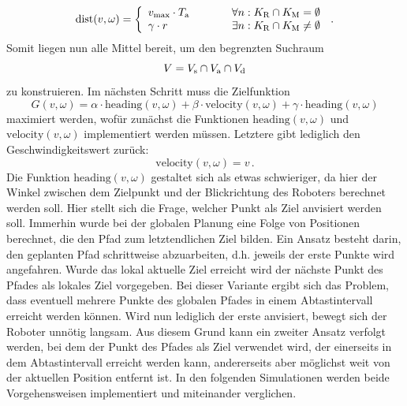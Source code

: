 \begin{equation}
\text{dist}(v, \omega) = \left\{ \begin{array}{ll}
v_{\text{max}}\cdot T_{\text{a}} & \hspace{1cm}\forall n: K_{\text{R}}\cap K_{\text{M}} = \emptyset \\
\gamma \cdot r & \hspace{1cm}\exists n: K_{\text{R}}\cap K_{\text{M}} \neq \emptyset
\end{array}\right.\,.
\end{equation}
Somit liegen nun alle Mittel bereit, um den begrenzten Suchraum 
\begin{equation}
V = V_{\text{s}}\cap V_{\text{a}}\cap V_{\text{d}}
\end{equation}
zu konstruieren. Im nächsten Schritt muss die Zielfunktion
\begin{equation}
G(v, \omega) = \alpha\cdot \text{heading}(v,\omega) + \beta\cdot \text{velocity}(v,\omega) + \gamma\cdot \text{heading}(v,\omega)
\end{equation}
maximiert werden, wofür zunächst die Funktionen $\text{heading}(v,\omega)$ und $\text{velocity}(v,\omega)$ implementiert werden müssen. Letztere gibt lediglich den Geschwindigkeitswert zurück:
\begin{equation}
\text{velocity}(v,\omega) = v\,.
\end{equation}
Die Funktion $\text{heading}(v,\omega)$ gestaltet sich als etwas schwieriger, da hier der Winkel zwischen dem Zielpunkt und der Blickrichtung des Roboters berechnet werden soll. Hier stellt sich die Frage, welcher Punkt als Ziel anvisiert werden soll. Immerhin wurde bei der globalen Planung eine Folge von Positionen berechnet, die den Pfad zum letztendlichen Ziel bilden. Ein Ansatz besteht darin, den geplanten Pfad schrittweise abzuarbeiten, d.h. jeweils der erste Punkte wird angefahren. Wurde das lokal aktuelle Ziel erreicht wird der nächste Punkt des Pfades als lokales Ziel vorgegeben. Bei dieser Variante ergibt sich das Problem, dass eventuell mehrere Punkte des globalen Pfades in einem Abtastintervall erreicht werden können. Wird nun lediglich der erste anvisiert, bewegt sich der Roboter unnötig langsam. Aus diesem Grund kann ein zweiter Ansatz verfolgt werden, bei dem der Punkt des Pfades als Ziel verwendet wird, der einerseits in dem Abtastintervall erreicht werden kann, andererseits aber möglichst weit von der aktuellen Position entfernt ist. In den folgenden Simulationen werden beide Vorgehensweisen implementiert und miteinander verglichen.

